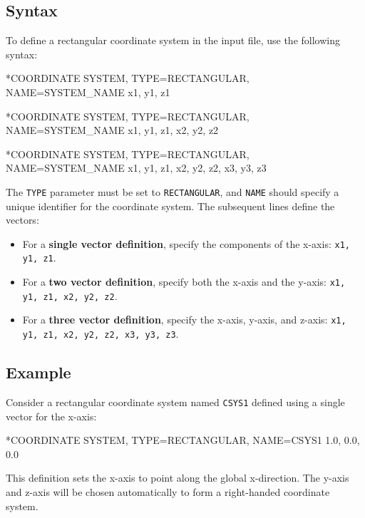\subsection{Syntax}


To define a rectangular coordinate system in the input file, use the following syntax:


\begin{codeBlock}
*COORDINATE SYSTEM, TYPE=RECTANGULAR, NAME=SYSTEM_NAME
x1, y1, z1
\end{codeBlock}


\begin{codeBlock}
*COORDINATE SYSTEM, TYPE=RECTANGULAR, NAME=SYSTEM_NAME
x1, y1, z1, x2, y2, z2
\end{codeBlock}


\begin{codeBlock}
*COORDINATE SYSTEM, TYPE=RECTANGULAR, NAME=SYSTEM_NAME
x1, y1, z1, x2, y2, z2, x3, y3, z3
\end{codeBlock}


The \texttt{TYPE} parameter must be set to \texttt{RECTANGULAR}, and \texttt{NAME} should specify a unique identifier for the coordinate system. The subsequent lines define the vectors:


\begin{itemize}
\item For a \textbf{single vector definition}, specify the components of the x-axis: \texttt{x1, y1, z1}.
\item For a \textbf{two vector definition}, specify both the x-axis and the y-axis: \texttt{x1, y1, z1, x2, y2, z2}.
\item For a \textbf{three vector definition}, specify the x-axis, y-axis, and z-axis: \texttt{x1, y1, z1, x2, y2, z2, x3, y3, z3}.
\end{itemize}


\subsection{Example}


Consider a rectangular coordinate system named \texttt{CSYS1} defined using a single vector for the x-axis:


\begin{codeBlock}
*COORDINATE SYSTEM, TYPE=RECTANGULAR, NAME=CSYS1
1.0, 0.0, 0.0
\end{codeBlock}


This definition sets the x-axis to point along the global x-direction. The y-axis and z-axis will be chosen automatically to form a right-handed coordinate system.


